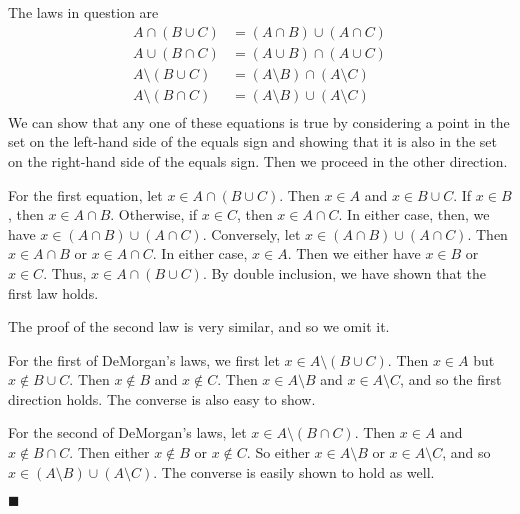 \documentclass[12pt]{article}
\renewcommand{\qed}{\hfill$\blacksquare$}
\renewenvironment{proof}{\begin{addmargin}[1em]{0em}\begin{newproof}}{\end{newproof}\end{addmargin}\qed}
\begin{document}
\begin{proof}
The laws in question are
\begin{equation*}
	\begin{split}
		A \cap \left(B\cup C\right) & = \left(A\cap B\right)\cup \left(A\cap C\right) \\
		A \cup \left(B\cap C\right) & = \left(A \cup B\right) \cap \left(A\cup C\right) \\
		A \setminus \left(B\cup C\right) & = \left(A\setminus B\right)\cap \left(A\setminus C\right)\\
		A \setminus \left(B\cap C\right) & = \left(A\setminus B\right)\cup \left(A\setminus C\right) \\
	\end{split}
\end{equation*}
We can show that any one of these equations is true by considering a point in the set on the left-hand side of the equals sign and showing that it is also in the set on the right-hand side of the equals sign. Then we proceed in the other direction. 

For the first equation, let $x\in A\cap \left(B\cup C\right)$. Then $x\in A$ and $x\in B\cup C$. If $x\in B$, then $x\in A\cap B$. Otherwise, if $x\in C$, then $x \in A\cap C$. In either case, then, we have $x \in \left(A\cap B\right)\cup \left(A\cap C\right)$. Conversely, let $x\in \left(A\cap B\right)\cup \left(A\cap C\right)$. Then $x \in A\cap B$ or $x \in A\cap C$. In either case, $x\in A$. Then we either have $x \in B$ or $x\in C$. Thus, $ x \in A\cap \left(B\cup C\right)$. By double inclusion, we have shown that the first law holds.

The proof of the second law is very similar, and so we omit it.

For the first of DeMorgan's laws, we first let $x \in A\setminus \left(B\cup C\right)$. Then $x\in A$ but $x\notin B\cup C$. Then $x\notin B$ and $x\notin C$. Then $x\in A\setminus B$ and $x\in A\setminus C$, and so the first direction holds. The converse is also easy to show.

For the second of DeMorgan's laws, let $x\in A\setminus \left(B\cap C\right)$. Then $x\in A$ and $x\notin B\cap C$. Then either $x\notin B$ or $x\notin C$. So either $x\in A\setminus B$ or $x\in A\setminus C$, and so $x \in \left(A\setminus B\right)\cup\left(A\setminus C\right)$. The converse is easily shown to hold as well.
\end{proof}
\end{document}
